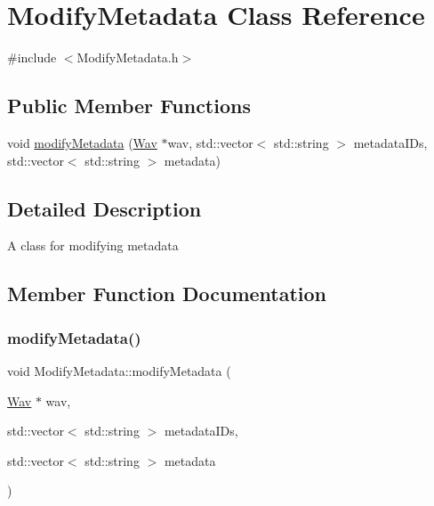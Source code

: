\hypertarget{classModifyMetadata}{}\section{Modify\+Metadata Class Reference}
\label{classModifyMetadata}


{\ttfamily \#include $<$Modify\+Metadata.\+h$>$}

\subsection*{Public Member Functions}
\begin{DoxyCompactItemize}
\item 
void \hyperlink{classModifyMetadata_a63a9b891ee5df3ea1d2945c1fe6481ef}{modify\+Metadata} (\hyperlink{classWav}{Wav} $\ast$wav, std\+::vector$<$ std\+::string $>$ metadata\+I\+Ds, std\+::vector$<$ std\+::string $>$ metadata)
\end{DoxyCompactItemize}


\subsection{Detailed Description}
A class for modifying metadata 

\subsection{Member Function Documentation}
\mbox{\label{classModifyMetadata_a63a9b891ee5df3ea1d2945c1fe6481ef}} 
\subsubsection{\texorpdfstring{modify\+Metadata()}{modifyMetadata()}}
{\footnotesize\ttfamily void Modify\+Metadata\+::modify\+Metadata (\begin{DoxyParamCaption}\item[{\hyperlink{classWav}{Wav} $\ast$}]{wav,  }\item[{std\+::vector$<$ std\+::string $>$}]{metadata\+I\+Ds,  }\item[{std\+::vector$<$ std\+::string $>$}]{metadata }\end{DoxyParamCaption})}

